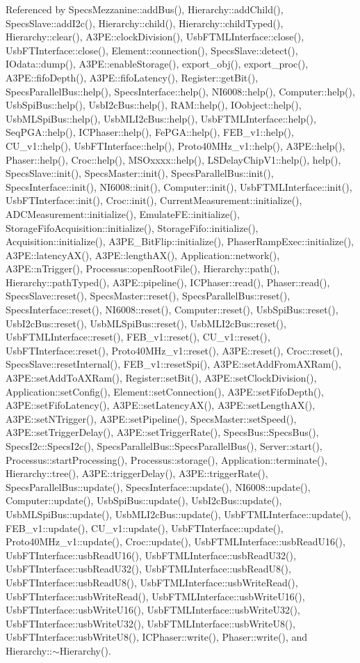Referenced by SpecsMezzanine::addBus(), Hierarchy::addChild(), SpecsSlave::addI2c(), Hierarchy::child(), Hierarchy::childTyped(), Hierarchy::clear(), A3PE::clockDivision(), UsbFTMLInterface::close(), UsbFTInterface::close(), Element::connection(), SpecsSlave::detect(), IOdata::dump(), A3PE::enableStorage(), export\_\-obj(), export\_\-proc(), A3PE::fifoDepth(), A3PE::fifoLatency(), Register::getBit(), SpecsParallelBus::help(), SpecsInterface::help(), NI6008::help(), Computer::help(), UsbSpiBus::help(), UsbI2cBus::help(), RAM::help(), IOobject::help(), UsbMLSpiBus::help(), UsbMLI2cBus::help(), UsbFTMLInterface::help(), SeqPGA::help(), ICPhaser::help(), FePGA::help(), FEB\_\-v1::help(), CU\_\-v1::help(), UsbFTInterface::help(), Proto40MHz\_\-v1::help(), A3PE::help(), Phaser::help(), Croc::help(), MSOxxxx::help(), LSDelayChipV1::help(), help(), SpecsSlave::init(), SpecsMaster::init(), SpecsParallelBus::init(), SpecsInterface::init(), NI6008::init(), Computer::init(), UsbFTMLInterface::init(), UsbFTInterface::init(), Croc::init(), CurrentMeasurement::initialize(), ADCMeasurement::initialize(), EmulateFE::initialize(), StorageFifoAcquisition::initialize(), StorageFifo::initialize(), Acquisition::initialize(), A3PE\_\-BitFlip::initialize(), PhaserRampExec::initialize(), A3PE::latencyAX(), A3PE::lengthAX(), Application::network(), A3PE::nTrigger(), Processus::openRootFile(), Hierarchy::path(), Hierarchy::pathTyped(), A3PE::pipeline(), ICPhaser::read(), Phaser::read(), SpecsSlave::reset(), SpecsMaster::reset(), SpecsParallelBus::reset(), SpecsInterface::reset(), NI6008::reset(), Computer::reset(), UsbSpiBus::reset(), UsbI2cBus::reset(), UsbMLSpiBus::reset(), UsbMLI2cBus::reset(), UsbFTMLInterface::reset(), FEB\_\-v1::reset(), CU\_\-v1::reset(), UsbFTInterface::reset(), Proto40MHz\_\-v1::reset(), A3PE::reset(), Croc::reset(), SpecsSlave::resetInternal(), FEB\_\-v1::resetSpi(), A3PE::setAddFromAXRam(), A3PE::setAddToAXRam(), Register::setBit(), A3PE::setClockDivision(), Application::setConfig(), Element::setConnection(), A3PE::setFifoDepth(), A3PE::setFifoLatency(), A3PE::setLatencyAX(), A3PE::setLengthAX(), A3PE::setNTrigger(), A3PE::setPipeline(), SpecsMaster::setSpeed(), A3PE::setTriggerDelay(), A3PE::setTriggerRate(), SpecsBus::SpecsBus(), SpecsI2c::SpecsI2c(), SpecsParallelBus::SpecsParallelBus(), Server::start(), Processus::startProcessing(), Processus::storage(), Application::terminate(), Hierarchy::tree(), A3PE::triggerDelay(), A3PE::triggerRate(), SpecsParallelBus::update(), SpecsInterface::update(), NI6008::update(), Computer::update(), UsbSpiBus::update(), UsbI2cBus::update(), UsbMLSpiBus::update(), UsbMLI2cBus::update(), UsbFTMLInterface::update(), FEB\_\-v1::update(), CU\_\-v1::update(), UsbFTInterface::update(), Proto40MHz\_\-v1::update(), Croc::update(), UsbFTMLInterface::usbReadU16(), UsbFTInterface::usbReadU16(), UsbFTMLInterface::usbReadU32(), UsbFTInterface::usbReadU32(), UsbFTMLInterface::usbReadU8(), UsbFTInterface::usbReadU8(), UsbFTMLInterface::usbWriteRead(), UsbFTInterface::usbWriteRead(), UsbFTMLInterface::usbWriteU16(), UsbFTInterface::usbWriteU16(), UsbFTMLInterface::usbWriteU32(), UsbFTInterface::usbWriteU32(), UsbFTMLInterface::usbWriteU8(), UsbFTInterface::usbWriteU8(), ICPhaser::write(), Phaser::write(), and Hierarchy::$\sim$Hierarchy().


